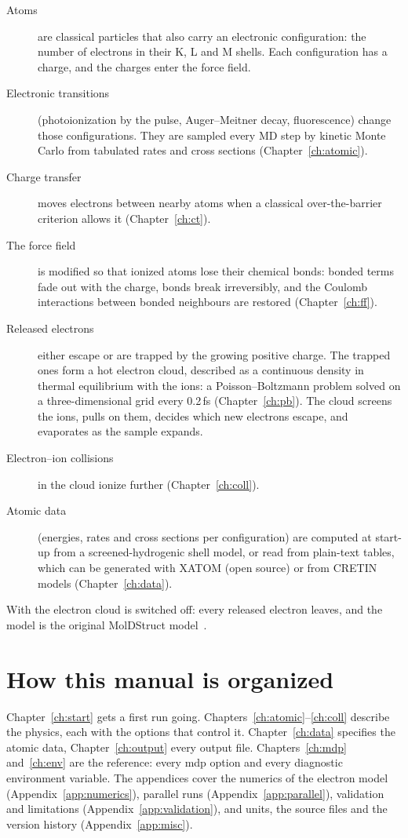 \begin{description}
  \item[Atoms] are classical particles that also carry an electronic configuration: the number of electrons in their
    K, L and M shells.
    Each configuration has a charge, and the charges enter the force field.
  \item[Electronic transitions] (photoionization by the pulse, Auger--Meitner decay, fluorescence) change those
    configurations.
    They are sampled every MD step by kinetic Monte Carlo from tabulated rates and cross sections
    (Chapter~\ref{ch:atomic}).
  \item[Charge transfer] moves electrons between nearby atoms when a classical over-the-barrier criterion allows it
    (Chapter~\ref{ch:ct}).
  \item[The force field] is modified so that ionized atoms lose their chemical bonds: bonded terms fade out with the
    charge, bonds break irreversibly, and the Coulomb interactions between bonded neighbours are restored
    (Chapter~\ref{ch:ff}).
  \item[Released electrons] either escape or are trapped by the growing positive charge.
    The trapped ones form a hot electron cloud, described as a continuous density in thermal equilibrium with the ions:
    a Poisson--Boltzmann problem solved on a three-dimensional grid every 0.2\,fs (Chapter~\ref{ch:pb}).
    The cloud screens the ions, pulls on them, decides which new electrons escape, and evaporates as the sample
    expands.
  \item[Electron--ion collisions] in the cloud ionize further (Chapter~\ref{ch:coll}).
  \item[Atomic data] (energies, rates and cross sections per configuration) are computed at start-up from a
    screened-hydrogenic shell model, or read from plain-text tables, which can be generated with XATOM (open source)
    or from CRETIN models (Chapter~\ref{ch:data}).
\end{description}

With  the electron cloud is switched off: every released electron leaves, and the model is
the original MolDStruct model~\cite{ostlin2018}.

\section{How this manual is organized}

Chapter~\ref{ch:start} gets a first run going.
Chapters~\ref{ch:atomic}--\ref{ch:coll} describe the physics, each with the options that control it.
Chapter~\ref{ch:data} specifies the atomic data, Chapter~\ref{ch:output} every output file.
Chapters~\ref{ch:mdp} and~\ref{ch:env} are the reference: every mdp option and every diagnostic environment variable.
The appendices cover the numerics of the electron model (Appendix~\ref{app:numerics}), parallel runs
(Appendix~\ref{app:parallel}), validation and limitations (Appendix~\ref{app:validation}), and units, the source
files and the version history (Appendix~\ref{app:misc}).

